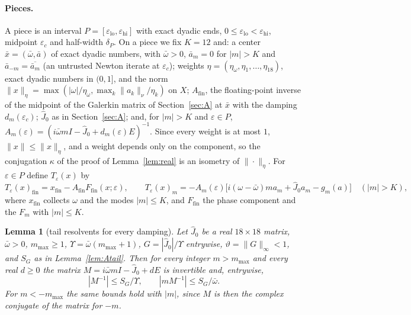 \documentclass[11pt]{article}
\newtheorem{lemma}{Lemma}[section]
\theoremstyle{definition}
\begin{document}
\paragraph{Pieces.} A piece is an interval $P = [\varepsilon_{\mathrm{lo}}, \varepsilon_{\mathrm{hi}}]$ with exact dyadic ends, $0 \le \varepsilon_{\mathrm{lo}} < \varepsilon_{\mathrm{hi}}$, midpoint $\varepsilon_c$ and half-width $\delta_P$. On a piece we fix $K = 12$ and: a center $\bar x = (\bar\omega, \bar a)$ of exact dyadic numbers, with $\bar\omega > 0$, $\bar a_m = 0$ for $|m| > K$ and $\bar a_{-m} = \overline{\bar a_m}$ (an untrusted Newton iterate at $\varepsilon_c$); weights $\eta = (\eta_\omega, \eta_1, \dots, \eta_{18})$, exact dyadic numbers in $(0, 1]$, and the norm $\|x\|_\eta = \max(|\omega|/\eta_\omega, \max_k\|a_k\|_\nu/\eta_k)$ on $X$; $A_{\mathrm{fin}}$, the floating-point inverse of the midpoint of the Galerkin matrix of Section~\ref{sec:A} at $\bar x$ with the damping $d_m(\varepsilon_c)$; $\hat J_0$ as in Section~\ref{sec:A}; and, for $|m| > K$ and $\varepsilon \in P$, $A_m(\varepsilon) = (i\bar\omega mI - \hat J_0 + d_m(\varepsilon)E)^{-1}$. Since every weight is at most $1$, $\|x\| \le \|x\|_\eta$, and a weight depends only on the component, so the conjugation $\kappa$ of the proof of Lemma~\ref{lem:real} is an isometry of $\|\cdot\|_\eta$. For $\varepsilon \in P$ define $T_\varepsilon(x)$ by
\begin{equation}\label{eq:Teps}
  T_\varepsilon(x)_{\mathrm{fin}} = x_{\mathrm{fin}} - A_{\mathrm{fin}}F_{\mathrm{fin}}(x;\varepsilon), \qquad T_\varepsilon(x)_m = -A_m(\varepsilon)\big[i(\omega - \bar\omega)ma_m + \hat J_0a_m - g_m(a)\big] \quad (|m| > K),
\end{equation}
where $x_{\mathrm{fin}}$ collects $\omega$ and the modes $|m| \le K$, and $F_{\mathrm{fin}}$ the phase component and the $F_m$ with $|m| \le K$.

\begin{lemma}[tail resolvents for every damping]\label{lem:tailT}
Let $\hat J_0$ be a real $18 \times 18$ matrix, $\bar\omega > 0$, $m_{\max} \ge 1$, $\Upsilon = \bar\omega(m_{\max} + 1)$, $G = |\hat J_0|/\Upsilon$ entrywise, $\vartheta = \|G\|_\infty < 1$, and $S_G$ as in Lemma~\ref{lem:Atail}. Then for every integer $m > m_{\max}$ and every real $d \ge 0$ the matrix $M = i\bar\omega mI - \hat J_0 + dE$ is invertible and, entrywise,
\[ |M^{-1}| \le S_G/\Upsilon, \qquad |mM^{-1}| \le S_G/\bar\omega. \]
For $m < -m_{\max}$ the same bounds hold with $|m|$, since $M$ is then the complex conjugate of the matrix for $-m$.
\end{lemma}
\end{document}
